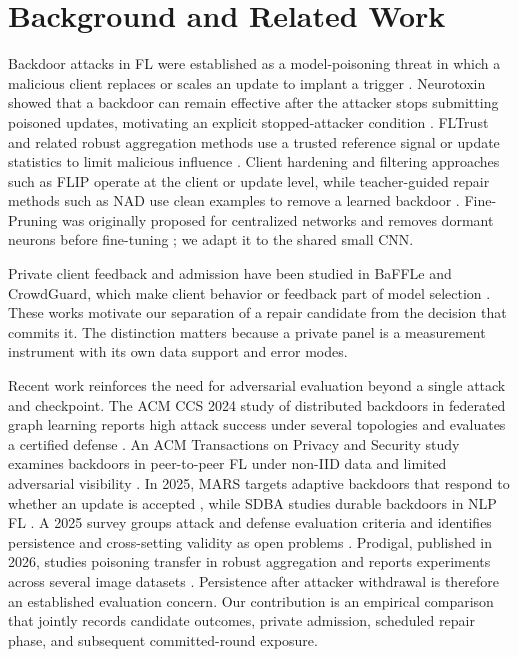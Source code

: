 \documentclass[sigconf,review,anonymous]{acmart}
\begin{document}
\section{Background and Related Work}
Backdoor attacks in FL were established as a model-poisoning threat in which a malicious client replaces or scales an update to implant a trigger \cite{bagdasaryan2020how}. Neurotoxin showed that a backdoor can remain effective after the attacker stops submitting poisoned updates, motivating an explicit stopped-attacker condition \cite{zhang2022neurotoxin}. FLTrust and related robust aggregation methods use a trusted reference signal or update statistics to limit malicious influence \cite{cao2021fltrust}. Client hardening and filtering approaches such as FLIP operate at the client or update level, while teacher-guided repair methods such as NAD use clean examples to remove a learned backdoor \cite{wang2022flip,li2021nad}. Fine-Pruning was originally proposed for centralized networks and removes dormant neurons before fine-tuning \cite{liu2018finepruning}; we adapt it to the shared small CNN.

Private client feedback and admission have been studied in BaFFLe and CrowdGuard, which make client behavior or feedback part of model selection \cite{fu2020baffle,zhang2022crowdguard}. These works motivate our separation of a repair candidate from the decision that commits it. The distinction matters because a private panel is a measurement instrument with its own data support and error modes.

Recent work reinforces the need for adversarial evaluation beyond a single attack and checkpoint. The ACM CCS 2024 study of distributed backdoors in federated graph learning reports high attack success under several topologies and evaluates a certified defense \cite{yang2024distributed}. An ACM Transactions on Privacy and Security study examines backdoors in peer-to-peer FL under non-IID data and limited adversarial visibility \cite{syros2024p2p}. In 2025, MARS targets adaptive backdoors that respond to whether an update is accepted \cite{wan2025mars}, while SDBA studies durable backdoors in NLP FL \cite{li2025sdba}. A 2025 survey groups attack and defense evaluation criteria and identifies persistence and cross-setting validity as open problems \cite{li2025survey}. Prodigal, published in 2026, studies poisoning transfer in robust aggregation and reports experiments across several image datasets \cite{liu2026prodigal}. Persistence after attacker withdrawal is therefore an established evaluation concern. Our contribution is an empirical comparison that jointly records candidate outcomes, private admission, scheduled repair phase, and subsequent committed-round exposure.
\end{document}
